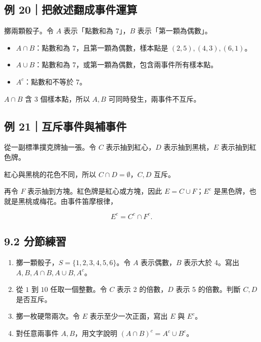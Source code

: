 \documentclass[11pt,a4paper]{article}
\providecommand{\tightlist}{%
  \setlength{\itemsep}{0pt}\setlength{\parskip}{0pt}}
\begin{document}
\subsection{例 20｜把敘述翻成事件運算}\label{ux4f8b-20ux628aux6558ux8ff0ux7ffbux6210ux4e8bux4ef6ux904bux7b97}

擲兩顆骰子。令 \(A\) 表示「點數和為 7」，\(B\) 表示「第一顆為偶數」。

\begin{itemize}
\tightlist
\item
  \(A\cap B\)：點數和為 7，且第一顆為偶數，樣本點是 \((2,5),(4,3),(6,1)\)。
\item
  \(A\cup B\)：點數和為 7，或第一顆為偶數，包含兩事件所有樣本點。
\item
  \(A^c\)：點數和不等於 7。
\end{itemize}

\(A\cap B\) 含 3 個樣本點，所以 \(A,B\) 可同時發生，兩事件不互斥。

\subsection{例 21｜互斥事件與補事件}\label{ux4f8b-21ux4e92ux65a5ux4e8bux4ef6ux8207ux88dcux4e8bux4ef6}

從一副標準撲克牌抽一張。令 \(C\) 表示抽到紅心，\(D\) 表示抽到黑桃，\(E\) 表示抽到紅色牌。

紅心與黑桃的花色不同，所以 \(C\cap D=\emptyset\)，\(C,D\) 互斥。

再令 \(F\) 表示抽到方塊。紅色牌是紅心或方塊，因此 \(E=C\cup F\)；\(E^c\) 是黑色牌，也就是黑桃或梅花。由事件笛摩根律，

\[
E^c=C^c\cap F^c.
\]

\subsection{9.2 分節練習}\label{ux5206ux7bc0ux7df4ux7fd2-8}

\begin{enumerate}
\def\labelenumi{\arabic{enumi}.}
\tightlist
\item
  擲一顆骰子，\(S=\{1,2,3,4,5,6\}\)。令 \(A\) 表示偶數，\(B\) 表示大於 4。寫出 \(A,B,A\cap B,A\cup B,A^c\)。
\item
  從 \(1\) 到 \(10\) 任取一個整數。令 \(C\) 表示 2 的倍數，\(D\) 表示 5 的倍數。判斷 \(C,D\) 是否互斥。
\item
  擲一枚硬幣兩次。令 \(E\) 表示至少一次正面，寫出 \(E\) 與 \(E^c\)。
\item
  對任意兩事件 \(A,B\)，用文字說明 \((A\cap B)^c=A^c\cup B^c\)。
\end{enumerate}
\end{document}
